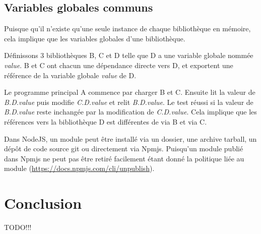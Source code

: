 \subsection{Variables globales communs}

Puisque qu'il n'existe qu'une seule instance de chaque bibliothèque en mémoire, cela implique
que les variables globales d'une bibliothèque.

Définissons 3 bibliothèques B, C et D telle que D a une variable globale nommée \textit{value}.
B et C ont chacun une dépendance directe vers D, et exportent une référence de la variable
globale \textit{value} de D.

Le programme principal A commence par charger B et C. Ensuite lit la valeur de \textit{B.D.value}
puis modifie \textit{C.D.value} et relit \textit{B.D.value}. Le test réussi si la valeur de
\textit{B.D.value} reste inchangée par la modification de \textit{C.D.value}. Cela implique que
les références vers la bibliothèque D est différentes de via B et via C.

Dans NodeJS, un module peut être installé via un dossier, une archive tarball, un dépôt de code source git ou
directement via Npmjs. Puisqu’un module publié dans Npmjs ne peut pas être retiré facilement étant donné
la politique liée au module (\url{https://docs.npmjs.com/cli/unpublish}).


\section{Conclusion}
TODO!!!
